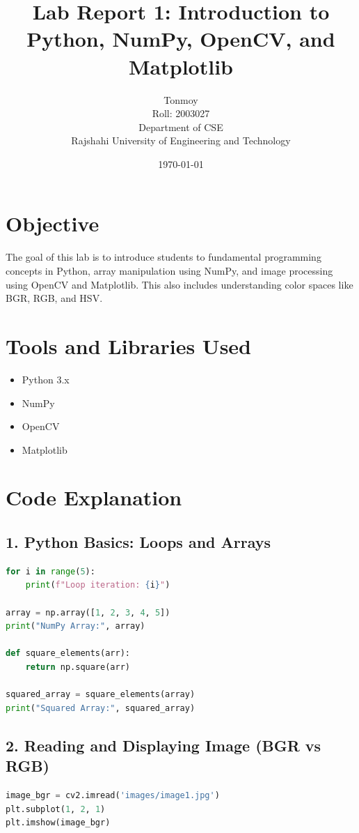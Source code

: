 \documentclass[12pt]{article}
\title{Lab Report 1: Introduction to Python, NumPy, OpenCV, and Matplotlib}
\author{Tonmoy\\
Roll: 2003027\\
Department of CSE\\
Rajshahi University of Engineering and Technology}
\date{\today}
\begin{document}
\maketitle

\section*{Objective}
The goal of this lab is to introduce students to fundamental programming concepts in Python, array manipulation using NumPy, and image processing using OpenCV and Matplotlib. This also includes understanding color spaces like BGR, RGB, and HSV.

\section*{Tools and Libraries Used}
\begin{itemize}
    \item Python 3.x
    \item NumPy
    \item OpenCV
    \item Matplotlib
\end{itemize}

\section*{Code Explanation}

\subsection*{1. Python Basics: Loops and Arrays}
\begin{lstlisting}[language=Python, caption=Python Loop and NumPy Array]
for i in range(5):
    print(f"Loop iteration: {i}")

array = np.array([1, 2, 3, 4, 5])
print("NumPy Array:", array)

def square_elements(arr):
    return np.square(arr)

squared_array = square_elements(array)
print("Squared Array:", squared_array)
\end{lstlisting}

\subsection*{2. Reading and Displaying Image (BGR vs RGB)}
\begin{lstlisting}[language=Python, caption=Reading and Displaying Image]
image_bgr = cv2.imread('images/image1.jpg')
plt.subplot(1, 2, 1)
plt.imshow(image_bgr)
\end{lstlisting}
\end{document}
